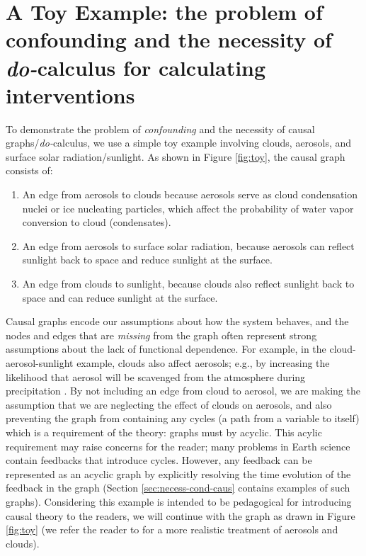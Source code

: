 \documentclass[12pt]{article}
\begin{document}
\section{A Toy Example: the problem of confounding and the necessity
  of \textit{do-}calculus for calculating interventions}
\label{sec:causal-graphs-pearls}

To demonstrate the problem of \textit{confounding} and the necessity
of causal graphs/\textit{do-}calculus, we use a simple toy
example involving clouds, aerosols, and surface solar
radiation/sunlight. As shown in Figure \ref{fig:toy}, the causal
graph consists of:

\begin{enumerate}
\item An edge from aerosols to clouds because aerosols serve as cloud
  condensation nuclei or ice nucleating particles, which affect the probability of water vapor conversion to cloud (condensates).
\item An edge from aerosols to surface solar radiation, because
  aerosols can reflect sunlight back to space and reduce sunlight at
  the surface.
\item An edge from clouds to sunlight, because clouds also reflect
  sunlight back to space and can reduce sunlight at the surface.
\end{enumerate}

Causal graphs encode our assumptions about how the system behaves, and
the nodes and edges that are \textit{missing} from the graph often
represent strong assumptions about the lack of functional
dependence. For example, in the cloud-aerosol-sunlight example, clouds
also affect aerosols; e.g., by increasing the likelihood that aerosol
will be scavenged from the atmosphere during precipitation
\citep[e.g.,][]{radke-scavenge-1980, jurado2008,
  blanco-alegre2018}. By not including an edge from cloud to aerosol,
we are making the assumption that we are neglecting the effect of
clouds on aerosols, and also preventing the graph from containing any
cycles (a path from a variable to itself) which is a requirement of
the theory: graphs must by acyclic. This acylic requirement may raise
concerns for the reader; many problems in Earth science contain
feedbacks that introduce cycles. However, any feedback can be
represented as an acyclic graph by explicitly resolving the time
evolution of the feedback in the graph (Section
\ref{sec:necess-cond-caus} contains examples of such graphs).
Considering this example is intended to be pedagogical for introducing
causal theory to the readers, we will continue with the graph as drawn
in Figure \ref{fig:toy} (we refer the reader to \cite{gryspeerdt-2019}
for a more realistic treatment of aerosols and clouds).
\end{document}
